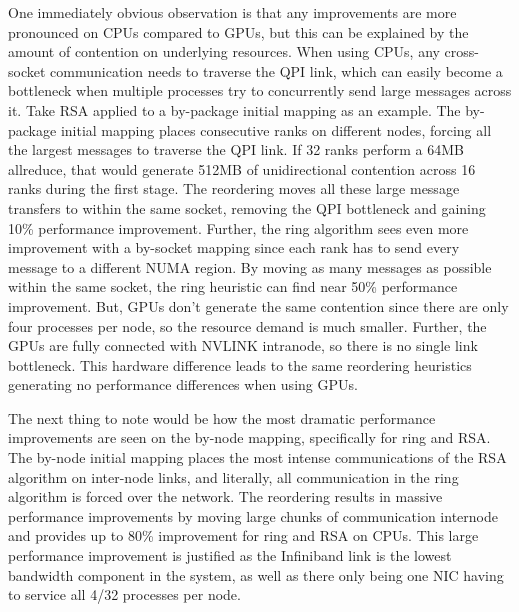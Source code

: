 One immediately obvious observation is that any improvements are more pronounced on CPUs compared to GPUs, but this can be explained by the amount of contention on underlying resources.
When using CPUs, any cross-socket communication needs to traverse the QPI link, which can easily become a bottleneck when multiple processes try to concurrently send large messages across it.
Take RSA applied to a by-package initial mapping as an example.
The by-package initial mapping places consecutive ranks on different nodes, forcing all the largest messages to traverse the QPI link. 
If 32 ranks perform a 64MB allreduce, that would generate 512MB of unidirectional contention across 16 ranks during the first stage.
The reordering moves all these large message transfers to within the same socket, removing the QPI bottleneck and gaining 10\% performance improvement.   
Further, the ring algorithm sees even more improvement with a by-socket mapping since each rank has to send every message to a different NUMA region.
By moving as many messages as possible within the same socket, the ring heuristic can find near 50\% performance improvement.
But, GPUs don't generate the same contention since there are only four processes per node, so the resource demand is much smaller.
Further, the GPUs are fully connected with NVLINK intranode, so there is no single link bottleneck.
This hardware difference leads to the same reordering heuristics generating no performance differences when using GPUs.

The next thing to note would be how the most dramatic performance improvements are seen on the by-node mapping, specifically for ring and RSA. 
The by-node initial mapping places the most intense communications of the RSA algorithm on inter-node links, and literally, all communication in the ring algorithm is forced over the network.
The reordering results in massive performance improvements by moving large chunks of communication internode and provides up to 80\% improvement for ring and RSA on CPUs.
This large performance improvement is justified as the Infiniband link is the lowest bandwidth component in the system, as well as there only being one NIC having to service all 4/32 processes per node.

